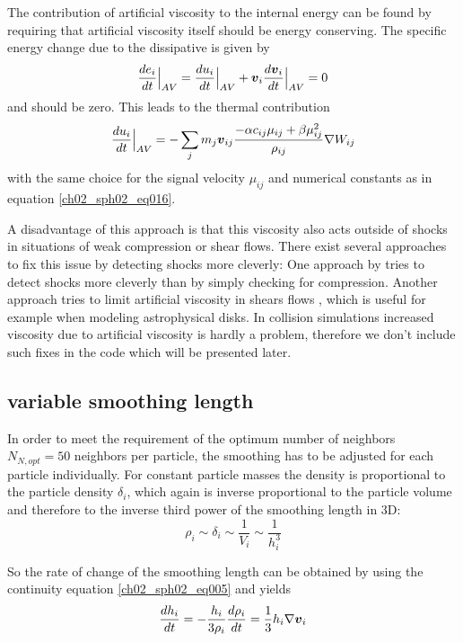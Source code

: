 The contribution of artificial viscosity to the internal energy can be found by requiring that artificial viscosity itself should be energy conserving. The specific energy change due to the dissipative is given by
\begin{equation}
\label{ch02_sph02_eq017}
\frac{de_i}{dt} \Big|_{AV}  = \frac{du_i}{dt}  \Big|_{AV} + \boldsymbol{v}_i \frac{d\boldsymbol{v}_i}{dt}  \Big|_{AV} = 0
\end{equation}
and should be zero. This leads to the thermal contribution
\begin{equation}
\label{ch02_sph02_eq018}
\frac{du_i }{dt} \Big|_{AV} = - \sum_{j} m_j \boldsymbol{v}_{ij} \frac{-\alpha c_{ij} \mu_{ij} + \beta \mu_{ij}^2}{\rho_{ij}} \nabla W_{ij}
\end{equation}
with the same choice for the signal velocity $\mu_{ij}$ and numerical constants as in equation \ref{ch02_sph02_eq016}.

A disadvantage of this approach is that this viscosity also acts outside of shocks in situations of weak compression or shear flows. There exist several approaches to fix this issue by detecting shocks more cleverly: One approach by \cite{Morris1997J.-Comput.-Phys.Morris} tries to detect shocks more cleverly than by simply checking for compression. Another approach tries to limit artificial viscosity in shears flows \citep{Balsara1995JCoPh.121..357B}, which is useful for example when modeling astrophysical disks. In collision simulations increased viscosity due to artificial viscosity is hardly a problem, therefore we don't include such fixes in the code which will be presented later.

\subsection{variable smoothing length}
In order to meet the requirement of the optimum number of neighbors $N_{N,opt} = 50$ neighbors per particle, the smoothing has to be adjusted for each particle individually. For constant particle masses the density is proportional to the particle density $\delta_i$, which again is inverse proportional to the particle volume and therefore to the inverse third power of the smoothing length in 3D:
\begin{equation}
\label{ch02_sph02_eq026}
\rho_i \sim \delta_i \sim \frac{1}{V_i} \sim \frac{1}{h_i^3}
\end{equation}

So the rate of change of the smoothing length can be obtained by using the continuity equation \ref{ch02_sph02_eq005} and yields
\begin{equation}
\label{ch02_sph02_eq027}
\frac{d h_i}{dt} = - \frac{h_i}{3 \rho_i} \frac{d \rho_i}{dt} = \frac{1}{3} h_i \nabla \boldsymbol{v}_i
\end{equation}

